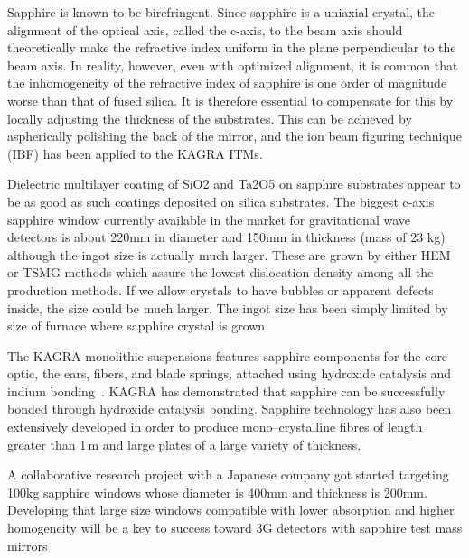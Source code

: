 Sapphire is known to be birefringent. Since sapphire is a uniaxial crystal, the alignment of the optical axis, called the c-axis, to the beam axis should theoretically make the refractive index uniform in the plane perpendicular to the beam axis. In reality, however, even with optimized alignment, it is common that the inhomogeneity of the refractive index of sapphire is one order of magnitude worse than that of fused silica. It is therefore essential to compensate for this by locally adjusting the thickness of the substrates. This can be achieved by aspherically polishing the back of the mirror, and the ion beam figuring technique (IBF) has been applied to the KAGRA ITMs.

Dielectric multilayer coating of SiO2 and Ta2O5 on sapphire substrates appear to be as good as such coatings deposited on silica substrates\cite{Hirose_2014b}.
The biggest c-axis sapphire window currently available in the market for gravitational wave detectors is about 220mm in diameter and 150mm in thickness (mass of 23 kg) although the ingot size is actually much larger. These are grown by either HEM or TSMG methods which assure the lowest dislocation density among all the production methods. If we allow crystals to have bubbles or apparent defects inside, the size could be much larger. The ingot size has been simply limited by size of furnace where sapphire crystal is grown.

The KAGRA monolithic suspensions features sapphire components for the core optic, the ears, fibers, and blade springs, attached using hydroxide catalysis and indium bonding~\cite{Kumar:2016_KAGRA}. KAGRA has demonstrated that sapphire can be successfully bonded through hydroxide catalysis bonding. Sapphire technology has also been extensively developed in order to produce mono--crystalline fibres of length greater than 1\,m and large plates of a large variety of thickness.

A collaborative research project with a Japanese company got started targeting 100kg sapphire windows whose diameter is 400mm and thickness is 200mm. Developing that large size windows compatible with lower absorption and higher homogeneity will be a key to success toward 3G detectors with sapphire test mass mirrors
